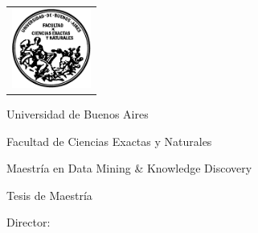 \newcommand{\HRule}{\rule{\linewidth}{0.2mm}}
%
\thispagestyle{empty}

\begin{center}\leavevmode

\vspace{-2cm}

\begin{tabular}{l}
\includegraphics[width=2.6cm]{frontmatter/logofcen.pdf}
\end{tabular}


{\large \sc Universidad de Buenos Aires

Facultad de Ciencias Exactas y Naturales

Maestría en Data Mining \& Knowledge Discovery}

\vspace{6.0cm}


\begin{huge}
\textbf{\tituloTesis}
\end{huge}

\vspace{2cm}

{\large Tesis de Maestría}

\vspace{2cm}

{\Large \autor}

\end{center}

\vfill

{\large

{Director: \director}

\vspace{.2cm}


\vspace{.2cm}

\lugar
}

\newpage\thispagestyle{empty}
